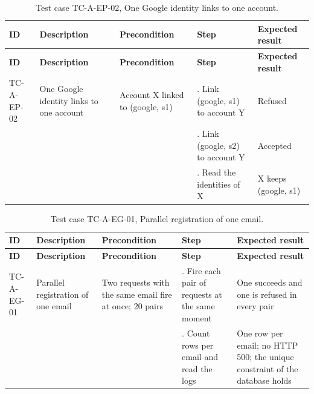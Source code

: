 {\small
\begin{longtable}{|>{\raggedright\arraybackslash}p{}|>{\raggedright\arraybackslash}p{}|>{\raggedright\arraybackslash}p{}|>{\raggedright\arraybackslash}p{}|>{\raggedright\arraybackslash}p{}|}
\caption{Test case TC-A-EP-02, One Google identity links to one account.} \\
\hline
\textbf{ID} & \textbf{Description} & \textbf{Precondition} & \textbf{Step} & \textbf{Expected result} \\ \hline
\endfirsthead
\hline
\textbf{ID} & \textbf{Description} & \textbf{Precondition} & \textbf{Step} & \textbf{Expected result} \\ \hline
\endhead
TC-A-EP-02 & One Google identity links to one account & Account X linked to (google, s1) & 1. Link (google, s1) to account Y & Refused \\ \hline
 &  &  & 2. Link (google, s2) to account Y & Accepted \\ \hline
 &  &  & 3. Read the identities of X & X keeps (google, s1) \\ \hline
\end{longtable}
}

{\small
\begin{longtable}{|>{\raggedright\arraybackslash}p{}|>{\raggedright\arraybackslash}p{}|>{\raggedright\arraybackslash}p{}|>{\raggedright\arraybackslash}p{}|>{\raggedright\arraybackslash}p{}|}
\caption{Test case TC-A-EG-01, Parallel registration of one email.} \\
\hline
\textbf{ID} & \textbf{Description} & \textbf{Precondition} & \textbf{Step} & \textbf{Expected result} \\ \hline
\endfirsthead
\hline
\textbf{ID} & \textbf{Description} & \textbf{Precondition} & \textbf{Step} & \textbf{Expected result} \\ \hline
\endhead
TC-A-EG-01 & Parallel registration of one email & Two requests with the same email fire at once; 20 pairs & 1. Fire each pair of requests at the same moment & One succeeds and one is refused in every pair \\ \hline
 &  &  & 2. Count rows per email and read the logs & One row per email; no HTTP 500; the unique constraint of the database holds \\ \hline
\end{longtable}
}


